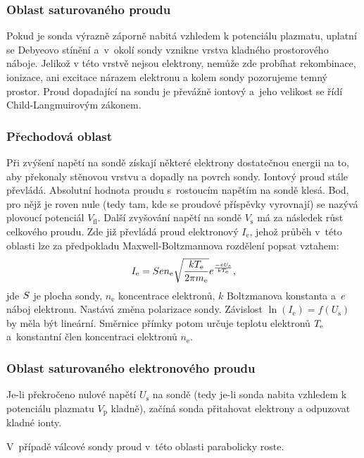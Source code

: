 \documentclass{protokol}
\newcommand\elemcharge{e}
\newcommand\boltzmann{k}
\newcommand\masselec{m_\mathrm{e}}
\newcommand\ielec{I_\mathrm{e}}
\newcommand\flpot{V_\mathrm{fl}}
\newcommand\plpot{V_\mathrm{p}}
\newcommand\potprobe{V_\mathrm{s}}
\newcommand\uprobe{U_\mathrm{s}}
\newcommand\denselec{n_\mathrm{e}}
\begin{document}
\subsubsection{Oblast saturovaného proudu \parta}
Pokud je sonda výrazně záporně nabitá vzhledem k potenciálu plazmatu,
uplatní se Debyeovo stínění a~v~okolí sondy vznikne vrstva kladného
prostorového náboje.
Jelikož v této vrstvě nejsou elektrony, nemůže zde probíhat rekombinace,
ionizace, ani excitace nárazem elektronu a kolem sondy pozorujeme temný prostor.
Proud dopadající na sondu je převážně iontový
a~jeho velikost se řídí Child-Langmuirovým zákonem.

\subsubsection{Přechodová oblast \partb}
Při zvýšení napětí na sondě získají některé elektrony dostatečnou energii na to,
aby překonaly stěnovou vrstvu a dopadly na povrch sondy.
Iontový proud stále převládá.
Absolutní hodnota proudu s~rostoucím napětím na sondě klesá.
Bod, pro nějž je roven nule (tedy tam, kde se proudové příspěvky vyrovnají)
se nazývá plovoucí potenciál $\flpot$.
Další zvyšování napětí na sondě $\potprobe$ má za následek růst celkového proudu.
Zde již převládá proud elektronový $\ielec$, jehož průběh v~této oblasti lze
za předpokladu Maxwell-Boltzmannova rozdělení popsat vztahem:
\begin{equation}
	\ielec = \probesurf \elemcharge \denselec
		\sqrt{\frac{\boltzmann \tempelec}{2 \pi \masselec}}
		e^{\frac{-\elemcharge\uprobe}{\boltzmann \tempelec}},
\end{equation}
jde $S$ je plocha sondy, $\denselec$ koncentrace elektronů,
$\boltzmann$ Boltzmanova konstanta a~$\elemcharge$ náboj elektronu.
Nastává změna polarizace sondy.
Závislost $\ln(\ielec)=f(\uprobe)$ by měla být lineární.
Směrnice přímky potom určuje teplotu elektronů $T_\mathrm{e}$
a~konstantní člen koncentraci elektronů $\denselec$.

\subsubsection{Oblast saturovaného elektronového proudu \partc}
Je-li překročeno nulové napětí $\uprobe$ na sondě
(tedy je-li sonda nabita vzhledem k potenciálu plazmatu $\plpot$ kladně),
začíná sonda přitahovat elektrony a odpuzovat kladné ionty.

V~případě válcové sondy proud v~této oblasti parabolicky roste.
\end{document}
